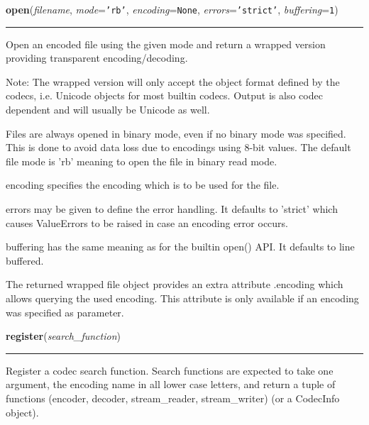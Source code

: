     \vspace{0.5ex}

\hspace{.8\funcindent}\begin{boxedminipage}{\funcwidth}

    \raggedright \textbf{open}(\textit{filename}, \textit{mode}={\tt \texttt{'}\texttt{rb}\texttt{'}}, \textit{encoding}={\tt None}, \textit{errors}={\tt \texttt{'}\texttt{strict}\texttt{'}}, \textit{buffering}={\tt 1})

    \vspace{-1.5ex}

    \rule{\textwidth}{0.5\fboxrule}
\setlength{\parskip}{2ex}
    Open an encoded file using the given mode and return a wrapped version 
    providing transparent encoding/decoding.

    Note: The wrapped version will only accept the object format defined by
    the codecs, i.e. Unicode objects for most builtin codecs. Output is 
    also codec dependent and will usually be Unicode as well.

    Files are always opened in binary mode, even if no binary mode was 
    specified. This is done to avoid data loss due to encodings using 8-bit
    values. The default file mode is 'rb' meaning to open the file in 
    binary read mode.

    encoding specifies the encoding which is to be used for the file.

    errors may be given to define the error handling. It defaults to 
    'strict' which causes ValueErrors to be raised in case an encoding 
    error occurs.

    buffering has the same meaning as for the builtin open() API. It 
    defaults to line buffered.

    The returned wrapped file object provides an extra attribute .encoding 
    which allows querying the used encoding. This attribute is only 
    available if an encoding was specified as parameter.

\setlength{\parskip}{1ex}
    \end{boxedminipage}

    \label{codecs:register}

    \vspace{0.5ex}

\hspace{.8\funcindent}\begin{boxedminipage}{\funcwidth}

    \raggedright \textbf{register}(\textit{search\_function})

    \vspace{-1.5ex}

    \rule{\textwidth}{0.5\fboxrule}
\setlength{\parskip}{2ex}
    Register a codec search function. Search functions are expected to take
    one argument, the encoding name in all lower case letters, and return a
    tuple of functions (encoder, decoder, stream\_reader, stream\_writer) 
    (or a CodecInfo object).

\setlength{\parskip}{1ex}
    \end{boxedminipage}

